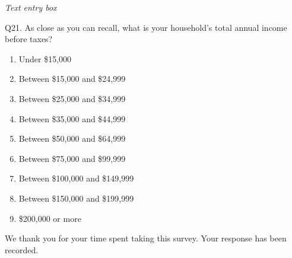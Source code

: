 \documentclass[english,12pt]{article}
\begin{document}
\textit{Text entry box}

Q21. As close as you can recall, what is your household's total annual income before taxes?
\begin{enumerate}
    \item[a.] Under \$15,000
    \item[b.] Between \$15,000 and \$24,999
    \item[c.] Between \$25,000 and \$34,999
    \item[d.] Between \$35,000 and \$44,999
    \item[e.] Between \$50,000 and \$64,999
    \item[f.] Between \$75,000 and \$99,999
    \item[g.] Between \$100,000 and \$149,999
    \item[h.] Between \$150,000 and \$199,999
    \item[i.] \$200,000 or more
\end{enumerate}

We thank you for your time spent taking this survey. Your response has been recorded.
\end{document}
